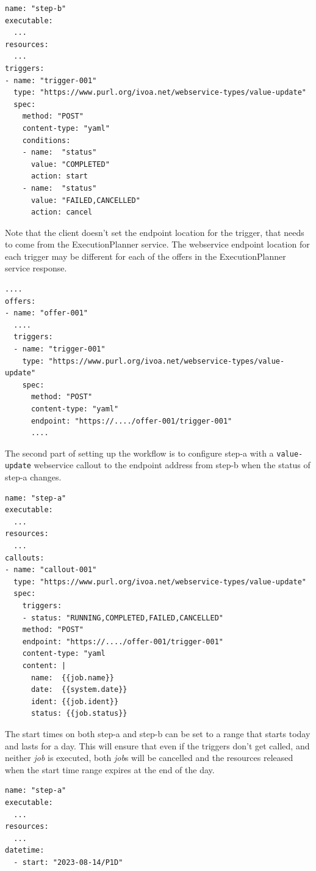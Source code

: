 \documentclass[11pt,a4paper]{ivoa}
\newcommand{\webservice} {webservice}
\newcommand{\execplanner} {ExecutionPlanner}
\newcommand{\codeword}[1] {\texttt{#1}}
\newcommand{\job} {\textit{job}}
\begin{document}
\begin{lstlisting}[]
name: "step-b"
executable:
  ...
resources:
  ...
triggers:
- name: "trigger-001"
  type: "https://www.purl.org/ivoa.net/webservice-types/value-update"
  spec:
    method: "POST"
    content-type: "yaml"
    conditions:
    - name:  "status"
      value: "COMPLETED"
      action: start
    - name:  "status"
      value: "FAILED,CANCELLED"
      action: cancel
\end{lstlisting}

Note that the client doesn't set the endpoint location for the trigger, that needs to
come from the \execplanner{} service.
The \webservice{} endpoint location for each trigger may be different for each of the
offers in the \execplanner{} service response.

\begin{lstlisting}[]
....
offers:
- name: "offer-001"
  ....
  triggers:
  - name: "trigger-001"
    type: "https://www.purl.org/ivoa.net/webservice-types/value-update"
    spec:
      method: "POST"
      content-type: "yaml"
      endpoint: "https://..../offer-001/trigger-001"
      ....
\end{lstlisting}

The second part of setting up the workflow is to configure step-a with a
\codeword{value-update} \webservice{} callout to the endpoint address from
step-b when the status of step-a changes.

\begin{lstlisting}[]
name: "step-a"
executable:
  ...
resources:
  ...
callouts:
- name: "callout-001"
  type: "https://www.purl.org/ivoa.net/webservice-types/value-update"
  spec:
    triggers:
    - status: "RUNNING,COMPLETED,FAILED,CANCELLED"
    method: "POST"
    endpoint: "https://..../offer-001/trigger-001"
    content-type: "yaml
    content: |
      name:  {{job.name}}
      date:  {{system.date}}
      ident: {{job.ident}}
      status: {{job.status}}
\end{lstlisting}

The start times on both step-a and step-b can be set to a range that starts today and lasts for a day.
This will ensure that even if the triggers don't get called, and neither \job{} is executed, both \job{}s will
be cancelled and the resources released when the start time range expires at the end of the day.

\begin{lstlisting}[]
name: "step-a"
executable:
  ...
resources:
  ...
datetime:
  - start: "2023-08-14/P1D"
\end{lstlisting}
\end{document}
